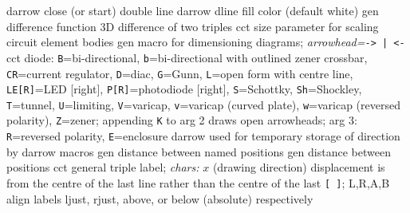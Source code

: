   {darrow}
  {close (or start) double line}
  {darrow}
  {dline fill color (default white)}
  {gen}
  {difference function}
  {3D}
  {difference of two triples}
  {cct}
  {size parameter for scaling circuit element bodies }
  {gen}
  {macro for dimensioning diagrams;
      {\sl arrowhead=}{\tt -> | <-}}
  {cct}
  {diode:
   {\tt B}=bi-directional,
   {\tt b}=bi-directional with outlined zener crossbar,
   {\tt CR}=current regulator,
   {\tt D}=diac,
   {\tt G}=Gunn,
   {\tt L}=open form with centre line,
   {\tt LE[R]}=LED [right],
   {\tt P[R]}=photodiode [right],
   {\tt S}=Schottky,
   {\tt Sh}=Shockley,
   {\tt T}=tunnel,
   {\tt U}=limiting,
   {\tt V}=varicap,
   {\tt v}=varicap (curved plate),
   {\tt w}=varicap (reversed polarity),
   {\tt Z}=zener;
   appending {\tt K} to arg 2 draws open arrowheads;
   arg 3: {\tt R}=reversed polarity, {\tt E}=enclosure }
  {darrow}
  {used for temporary storage of direction by darrow macros}
  {gen}
  {distance between named positions}
  {gen}
  {distance between positions}
  {cct}
  {general triple label; {\sl chars:}
    $x$ (drawing direction) displacement is from the centre of the last
      line rather than the centre of the last {\tt [ ]};
    L,R,A,B align labels ljust, rjust, above,
      or below (absolute) respectively  }
